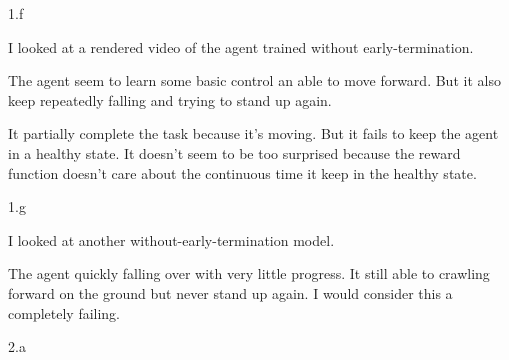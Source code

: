 \LARGE
1.f
\normalsize

\begin{answer}
  I looked at a rendered video of the agent trained without early-termination.

  The agent seem to learn some basic control an able to move forward.
  But it also keep repeatedly falling and trying to stand up again.

  It partially complete the task because it's moving. But it fails to keep
  the agent in a healthy state. It doesn't seem to be too surprised because
  the reward function doesn't care about the continuous time it keep
  in the healthy state.
\end{answer}
\clearpage


\LARGE
1.g
\normalsize

\begin{answer}
  I looked at another without-early-termination model.

  The agent quickly falling over with very little progress. It still
  able to crawling forward on the ground but never stand up again.
  I would consider this a completely failing.
\end{answer}
\clearpage

\LARGE
2.a
\normalsize

